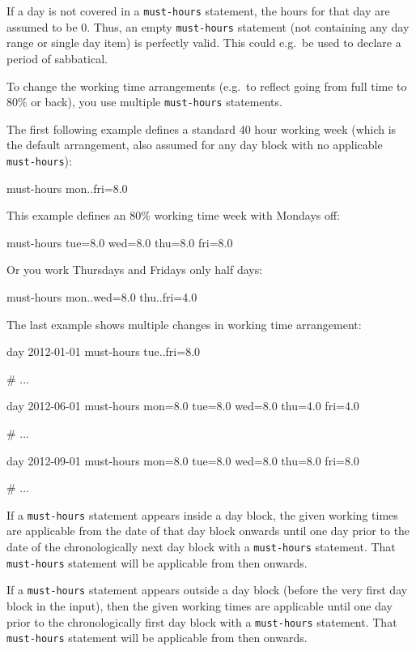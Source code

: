 \documentclass[11pt]{article}
\begin{document}
If a day is not covered in a \verb:must-hours: statement, the hours for that day are assumed to be 0. Thus, an empty \verb:must-hours: statement (not containing any day range or single day item) is perfectly valid. This could e.g.\ be used to declare a period of sabbatical.

To change the working time arrangements (e.g.\ to reflect going from full time to 80\% or back), you use multiple \verb:must-hours: statements.

The first following example defines a standard 40 hour working week (which is the default arrangement, also assumed for any day block with no applicable \verb:must-hours:):
\begin{inputfile}
must-hours mon..fri=8.0
\end{inputfile}

This example defines an 80\% working time week with Mondays off:
\begin{inputfile}
must-hours tue=8.0 wed=8.0 thu=8.0 fri=8.0
\end{inputfile}

Or you work Thursdays and Fridays only half days:
\begin{inputfile}
must-hours mon..wed=8.0 thu..fri=4.0
\end{inputfile}

The last example shows multiple changes in working time arrangement: 
\begin{inputfile}
day 2012-01-01
must-hours tue..fri=8.0

# ...

day 2012-06-01
must-hours mon=8.0 tue=8.0 wed=8.0 thu=4.0 fri=4.0

# ...

day 2012-09-01
must-hours mon=8.0 tue=8.0 wed=8.0 thu=8.0 fri=8.0

# ...
\end{inputfile}


If a \verb:must-hours: statement appears inside a day block, the given working times are applicable from the date of that day block onwards until one day prior to the date of the chronologically next day block with a \verb:must-hours: statement. That \verb:must-hours: statement will be applicable from then onwards.

If a \verb:must-hours: statement appears outside a day block (before the very first day block in the input), then the given working times are applicable until one day prior to the chronologically first day block with a \verb:must-hours: statement. That \verb:must-hours: statement will be applicable from then onwards.
\end{document}
